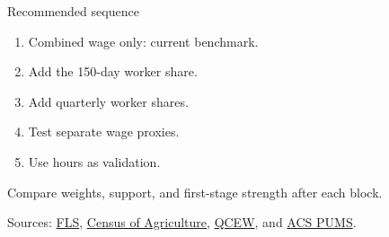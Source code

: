 \documentclass[aspectratio=169,11pt]{beamer}
\begin{document}
\begin{frame}{Recommended sequence}
  \begin{enumerate}
    \item Combined wage only: current benchmark.
    \item Add the 150-day worker share.
    \item Add quarterly worker shares.
    \item Test separate wage proxies.
    \item Use hours as validation.
  \end{enumerate}

  Compare weights, support, and first-stage strength after each block.

  \vspace{0.8em}
  \small
  Sources: \href{https://www.nass.usda.gov/Surveys/Guide_to_NASS_Surveys/Farm_Labor/}{FLS},
  \href{https://www.nass.usda.gov/Publications/AgCensus/2022/}{Census of Agriculture},
  \href{https://www.bls.gov/cew/}{QCEW}, and
  \href{https://www.census.gov/programs-surveys/acs/microdata.html}{ACS PUMS}.
\end{frame}
\end{document}
